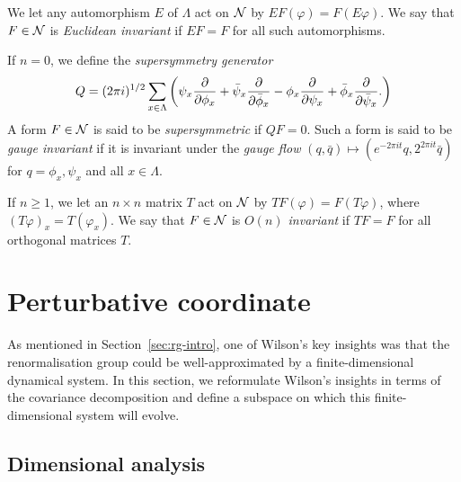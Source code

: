 We let any automorphism $E$ of $\Lambda$ act on $\mathcal{N}$ by $EF(\varphi) = F(E\varphi)$.
We say that $F\in\mathcal{N}$ is \emph{Euclidean invariant} if $EF = F$ for all such automorphisms.

If $n = 0$,
we define the \emph{supersymmetry generator}
\begin{equation}
Q = (2\pi i)^{1/2} \sum_{x\in\Lambda}
\left(
	\psi_x \frac{\partial }{\partial \phi_x} + \bar\psi_x \frac{\partial }{\partial \bar\phi_x}
		-
	\phi_x \frac{\partial }{\partial \psi_x} + \bar\phi_x \frac{\partial }{\partial \bar\psi_x}.
\right)
\end{equation}
A form $F \in \mathcal{N}$ is said to be \emph{supersymmetric} if $Q F = 0$.
Such a form is said to be \emph{gauge invariant} if it is invariant under the
\emph{gauge flow} $(q, \bar q) \mapsto (e^{-2\pi it} q, 2^{2\pi it} \bar q)$
for $q = \phi_x, \psi_x$ and all $x\in\Lambda$.

If $n \ge 1$, we let
an $n \times n$ matrix $T$ act on $\mathcal{N}$ by $T F(\varphi) = F(T \varphi)$,
where $(T\varphi)_x = T(\varphi_x)$.
We say that $F\in\mathcal{N}$ is \emph{$O(n)$ invariant} if $TF = F$ for all
orthogonal matrices $T$.


\section{Perturbative coordinate}

As mentioned in Section~\ref{sec:rg-intro}, one of Wilson's key insights was that the renormalisation
group could be well-approximated by a finite-dimensional dynamical system. In this
section, we reformulate Wilson's insights in terms of the covariance decomposition
and define a subspace on which this finite-dimensional system will evolve.



\subsection{Dimensional analysis}

